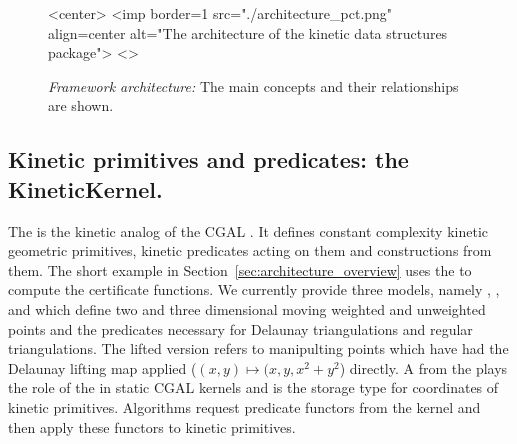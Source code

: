 \begin{figure}[htb]
\begin{ccHtmlOnly}
<center>
<imp border=1 src="./architecture_pct.png" align=center alt="The architecture of the kinetic data structures package">
<\center>
\end{ccHtmlOnly}
\caption{ \label{fig:architecture} 
{\em Framework architecture:} The main concepts and their relationships are shown. }
\end{figure}



\subsection{Kinetic primitives and predicates: the KineticKernel.}
\label{sec:kinetic_kernel}

The  is the kinetic analog of the CGAL
. It defines constant complexity kinetic geometric
primitives, kinetic predicates acting on them and constructions from
them. The short example in Section~\ref{sec:architecture_overview}
uses the  to compute the 
certificate functions. We currently provide three models, namely
,
,
and
which define two and three dimensional moving weighted and unweighted
points and the predicates necessary for Delaunay triangulations and
regular triangulations. The lifted version refers to manipulting
points which have had the Delaunay lifting map applied ($(x,y) \mapsto
(x,y,x^2+y^2$) directly.  A  from the
 plays the role of the  in static CGAL
kernels and is the storage type for coordinates of kinetic
primitives. Algorithms request predicate functors from the kernel and
then apply these functors to kinetic primitives.

